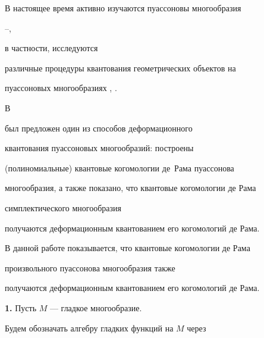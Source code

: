\date{}




\pagestyle{plain} %







\maketitle


\label{begin}








В настоящее время активно изучаются пуассоновы многообразия


\cite{Br}--\cite{Wein},


в частности, исследуются


различные процедуры квантования геометрических объектов на


пуассоновых многообразиях \cite{Hue}, \cite{Kon}.


В~\cite{C-Zh}


был предложен один из способов деформационного


квантования пуассоновых многообразий: построены


(полиномиальные) квантовые когомологии де~Рама пуассонова


многообразия, а также показано, что квантовые когомологии де Рама


симплектического многообразия


получаются деформационным квантованием его когомологий де Рама.


В данной работе показывается, что квантовые когомологии де Рама


произвольного пуассонова многообразия также


получаются деформационным квантованием его когомологий де Рама.


\medskip





\setcounter{section}{1}





{\bf 1.} Пусть $M$ --- гладкое многообразие.


Будем обозначать алгебру гладких функций на $M$ через


